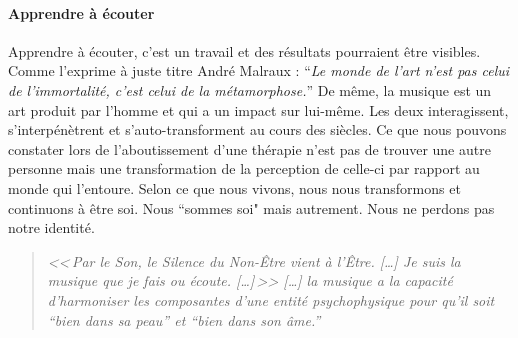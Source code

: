 \paragraph{Apprendre à écouter}

Apprendre à écouter,
c'est un travail et des résultats pourraient être visibles.
Comme l'exprime à juste titre André Malraux : \enquote{\emph{Le monde de
	l'art n'est pas celui de l'immortalité, c'est celui de la métamorphose.}}
De même, la musique est un art produit par l'homme et qui a un impact
sur lui-même. Les deux interagissent, s'interpénètrent et s'auto-transforment
au cours des siècles.
 Ce que nous pouvons constater lors de l'aboutissement
d'une thérapie n'est pas de trouver une autre personne mais une transformation
de la perception de celle-ci par rapport au monde qui l'entoure. 
Selon
ce que nous vivons, nous nous transformons et continuons à être
soi. Nous ``sommes soi" mais autrement. Nous ne perdons
pas notre identité.


\label{jeSuisLaMusique:viret}
\begin{quotation}
\emph{<<\,\emph{Par le Son, le Silence du Non-Être vient à l'Être}. [\dots] 
\textsl{Je suis}
	\emph{la musique que je fais ou écoute}. [\dots]\,>>
[\ldots] \emph{la musique a la capacité d'harmoniser
les composantes d'une entité psychophysique pour qu'il soit ``bien
dans sa peau'' et ``bien dans son âme.}''}\, \autocite[ch. 1,  p. 8]{viret:b}
\end{quotation}


